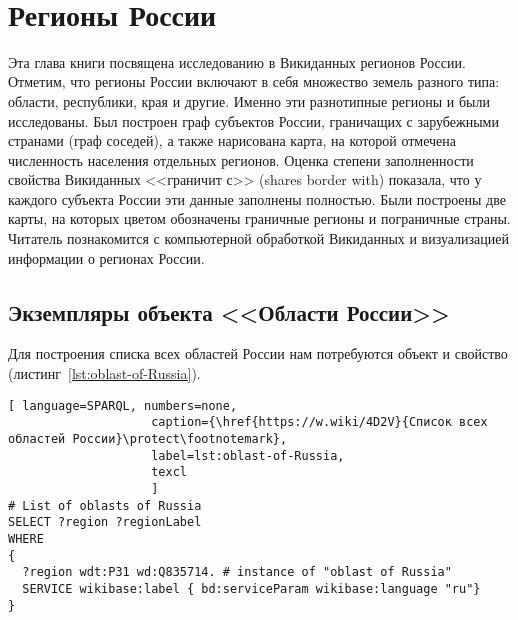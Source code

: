 ﻿﻿\chapter{Регионы России}
\label{ch:oblast-of-Russia}
Эта глава книги посвящена исследованию в Викиданных регионов России. 
Отметим, что регионы России включают в себя множество земель разного 
типа: области, республики, края и другие. Именно эти разнотипные регионы 
и были исследованы. Был построен граф субъектов России, граничащих 
с зарубежными странами (граф соседей), а также нарисована карта, 
на которой отмечена численность населения отдельных регионов. Оценка 
степени заполненности свойства Викиданных <<граничит с>> (shares border with) 
показала, что у каждого субъекта России эти данные заполнены полностью. Были построены две карты, на которых цветом обозначены граничные регионы и пограничные страны.
Читатель познакомится с компьютерной обработкой Викиданных и визуализацией 
информации о регионах России.

\label{question:q_subjects_of_Russia_3}

\section{Экземпляры объекта <<Области России>>}

Для построения списка всех областей России нам потребуются объект 
 и свойство  
(листинг~\protect\ref{lst:oblast-of-Russia}).

\begin{lstlisting}[ language=SPARQL, numbers=none,
                    caption={\href{https://w.wiki/4D2V}{Список всех областей России}\protect\footnotemark},
                    label=lst:oblast-of-Russia,
                    texcl 
                    ]
# List of oblasts of Russia
SELECT ?region ?regionLabel
WHERE
{
  ?region wdt:P31 wd:Q835714. # instance of "oblast of Russia"
  SERVICE wikibase:label { bd:serviceParam wikibase:language "ru"}
}
\end{lstlisting}%

